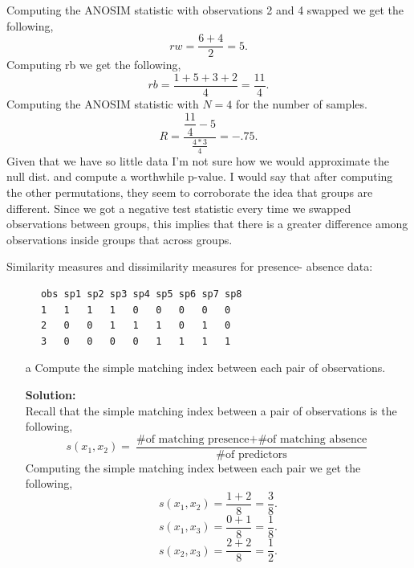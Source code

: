 \documentclass[12pt]{article}
\makeatletter
\theoremstyle{homework}
\newenvironment{exercise}[1]
{\def\@currentlabel{#1}\exercisecore}
{\endexercisecore}
\newcommand{\localhead}[1]{\par\smallskip\noindent\textbf{#1}\nobreak\\}%
\newcommand\solution{\localhead{Solution:}}
\makeatother
\begin{document}
\begin{exercise}{2}
\begin{enumerate}
      Computing the ANOSIM statistic with observations 2 and 4 swapped we get the following, 
      \begin{equation*}
        rw = \dfrac{6 + 4}{2} = 5.
      \end{equation*}
      Computing rb we get the following, 
      \begin{equation*}
        rb = \dfrac{1 + 5 + 3 + 2}{4} = \dfrac{11}{4}.
      \end{equation*}
      Computing the ANOSIM statistic with $N = 4$ for the number of samples. 
      \begin{equation*}
        R = \dfrac{\dfrac{11}{4} - 5}{\frac{4*3}{4}} = -.75.
      \end{equation*} 
      Given that we have so little data I'm not sure how we would approximate the null dist. and compute a worthwhile p-value. I would say that 
      after computing the other permutations, they seem to corroborate the idea that groups are different. Since we got a negative test statistic every time we swapped observations between groups, this 
      implies that there is a greater difference among observations inside groups that across groups. 
  \end{enumerate}
      \vspace{1in}


\begin{exercise}{3}Similarity measures and dissimilarity measures for presence-
  absence data:
  \begin{footnotesize}
    \begin{verbatim}
      obs sp1 sp2 sp3 sp4 sp5 sp6 sp7 sp8 
      1   1   1   1   0   0   0   0   0 
      2   0   0   1   1   1   0   1   0 
      3   0   0   0   0   1   1   1   1
    \end{verbatim}
    \end{footnotesize} 
    
    \begin{enumerate}
      \item[a]  Compute the simple matching index between each pair of
      observations.\\
      \solution Recall that the simple matching index between a pair of observations is the following,
      \begin{equation*}
        s(x_1, x_2) = \dfrac{\text{\# of matching presence} + \text{\# of matching absence}}{\text{\# of predictors}}
      \end{equation*}
      Computing the simple matching index between each pair we get the following, 
      \begin{equation*}
        s(x_1, x_2) = \dfrac{1 + 2}{8} = \dfrac{3}{8}.
      \end{equation*}
      \begin{equation*}
        s(x_1, x_3) = \dfrac{0 + 1}{8} = \dfrac{1}{8}.
      \end{equation*}
      \begin{equation*}
        s(x_2, x_3) = \dfrac{2 + 2}{8} = \dfrac{1}{2}.
      \end{equation*}
      \vspace{.15in}




\end{enumerate}
\end{exercise}
\end{exercise}
\end{document}
